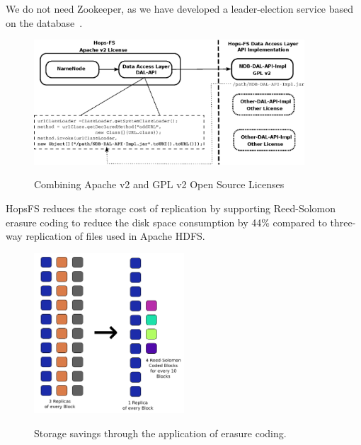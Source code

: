 We do not need Zookeeper, as we have developed a leader-election service based on the database~\cite{hopselection}.


\begin{figure}[h]
 \centering
 \includegraphics[width=0.9\textwidth]{./imgs/license-work-around.eps}
 \label{fig:license-work-around}
 \caption{Combining Apache v2 and GPL v2 Open Source Licenses}
\end{figure}


HopsFS reduces the storage cost of replication by supporting Reed-Solomon erasure coding to reduce the disk space consumption by 44\% compared to three-way replication of files used in Apache HDFS.


\begin{figure}[h]
 \centering
 \includegraphics[width=0.5\textwidth]{./imgs/erasure-coding.png}
 \label{fig:erasure-coding}
 \caption{Storage savings through the application of erasure coding.}
\end{figure}
